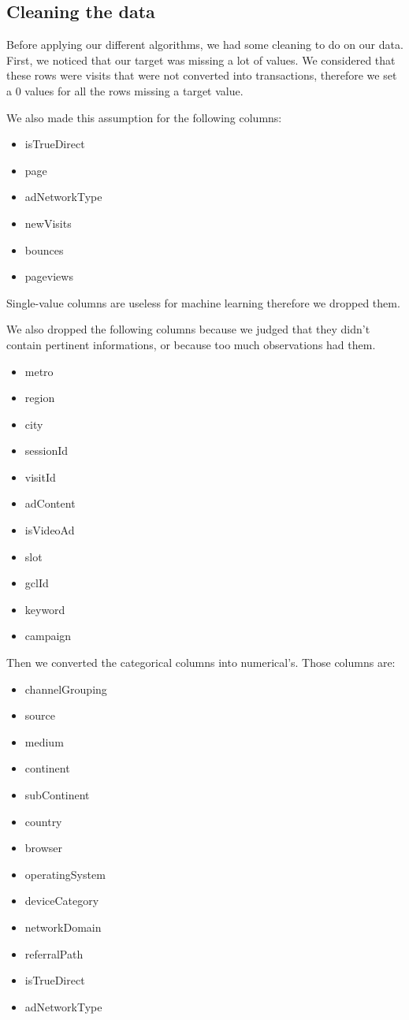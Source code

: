 \documentclass[a4paper, 12pt, one column]{article}
\begin{document}
\subsection{Cleaning the data}
Before applying our different algorithms, we had some cleaning to do on our data. First, we noticed that our target was missing a lot of values. We considered that these rows were visits that were not converted into transactions, therefore we set a 0 values for all the rows missing a target value.

We also made this assumption for the following columns:
\begin{itemize}
    \item isTrueDirect
    \item page
    \item adNetworkType
    \item newVisits
    \item bounces
    \item pageviews
\end{itemize}

Single-value columns are useless for machine learning therefore we dropped them.

We also dropped the following columns because we judged that they didn't contain pertinent informations, or because too much observations had them.
\begin{itemize}
    \item metro
    \item region
    \item city
    \item sessionId
    \item visitId
    \item adContent
    \item isVideoAd
    \item slot
    \item gclId
    \item keyword
    \item campaign
\end{itemize}


Then we converted the categorical columns into numerical's. Those columns are:
\begin{itemize}
    \item channelGrouping
    \item source
    \item medium
    \item continent
    \item subContinent
    \item country
    \item browser
    \item operatingSystem
    \item deviceCategory
    \item networkDomain
    \item referralPath
    \item isTrueDirect
    \item adNetworkType
\end{itemize}
\end{document}
